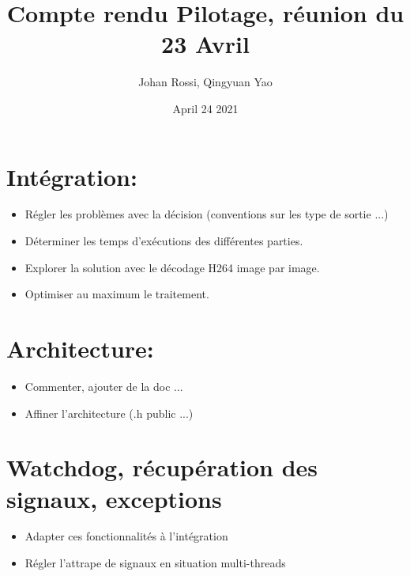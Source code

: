 \documentclass{article}
\title{Compte rendu Pilotage, réunion du 23 Avril}
\author{Johan Rossi, Qingyuan Yao}
\date{April 24 2021}
\begin{document}
\maketitle

\section{Intégration:}
\begin{itemize}
    \item Régler les problèmes avec la décision (conventions sur les type de sortie ...)
    \item Déterminer les temps d'exécutions des différentes parties.
    \item Explorer la solution avec le décodage H264 image par image.
    \item Optimiser au maximum le traitement.
\end{itemize}

\section{Architecture:}
\begin{itemize}
    \item Commenter, ajouter de la doc ...
    \item Affiner l'architecture (.h public ...)
\end{itemize}


\section{Watchdog, récupération des signaux, exceptions}
\begin{itemize}
    \item Adapter ces fonctionnalités à l'intégration
    \item Régler l'attrape de signaux en situation multi-threads
\end{itemize}
    
\end{document}
